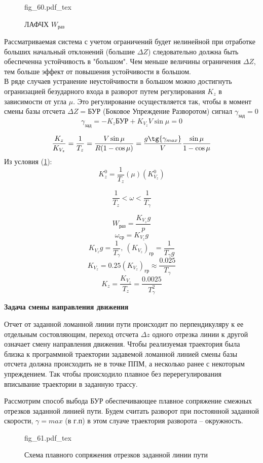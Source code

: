 \documentclass{article}
\newcommand{\incfig}[1]{
    {#1.pdf_tex}
}
\begin{document}
\begin{figure}[H]
	\centering
	\incfig{fig_60}
    \caption{ЛАФЧХ $W_\text{раз}$}
	\label{fig:fig_60}
\end{figure}

Рассматриваемая система с учетом ограничений будет нелинейной при отработке больших начальный отклонений (большие $\Delta Z$) следовательно должна быть обеспеченна устойчивость в "большом". 
Чем меньше величины ограничения $\Delta Z$, тем больше эффект от повышения устойчивости в большом.\\
В ряде случаев устранение неустойчивости в большом можно достигнуть огранизацией безударного входа в разворот путем регулирования $K_z$ в зависимости от угла $\mu$.
Это регулирование осуществляется так, чтобы в момент смены базы отсчета $\Delta Z = \text{БУР}$ (Боковое Упреждение Разворотом) сигнал $ \gamma_\text{зад} =  0$
\[
	\gamma_\text{зад} = -K_z \text{БУР} + K_{V_z} V \sin{\mu} = 0
\]

\[
	\frac{K_z}{K_{V_z}} = \frac{1}{T_z} = \frac{V \sin{\mu}}{R( 1 - \cos{\mu})} = \frac{g \tg{\gamma_{max}}}{V} \frac{\sin{\mu}}{1 - \cos{\mu}}
\]
Из условия (\ref{fig:fig_60}):
\[
	K_z^0 = \frac{1}{T_z}(\mu)(K_{V_z}^0)
\]

\[
	\frac{1}{T_z} < \omega < \frac{1}{T_\gamma}
\]

\[
	W_\text{раз} = \frac{K_{V_z} g}{p}
\]
\[
	\omega_\text{ср} = K_{V_z} g
\]
\[
	K_{V_z} g = \frac{1}{T_\gamma} , \ (K_{V_z})_\text{гр} = \frac{1}{T_\gamma g}
\]
\[
	K_{V_z} = 0.25(K_{V_z})_\text{гр} \approx \frac{0.025}{T_{\gamma}}
\]
\[
	K_z = \frac{K_{V_z}}{T_z} = \frac{0.0025}{T_\gamma^2}
\]

\textbf{Задача смены направления движения}


Отчет от заданной ломанной линии пути происходит по перпендикуляру к ее отдельным состовляющим, переход отсчета $\Delta z$ одного отрезка линии к другой означает смену направления движения. Чтобы реализуемая траектория была близка к программной траектории задавемой ломанной линией смены базы отсчета должна происходить не в точке ППМ, а несколько ранее с некоторым упреждением. Так чтобы происходило плавное без перерегулирования вписывание траектории в заданную трассу.

Рассмотрим способ выбода БУР обеспечивающее плавное сопряжение смежных отрезков заданной линией пути. Будем считать разворот при постоянной заданной скорости, $\gamma = max$ (в г.п) в этом слуаче траектория разворота -- окружность.

\begin{figure}[H]
	\centering
	\incfig{fig_61}
	\caption{Схема плавного сопряжения отрезков заданной линии пути}
	\label{fig:fig_61}
\end{figure}
\end{document}
